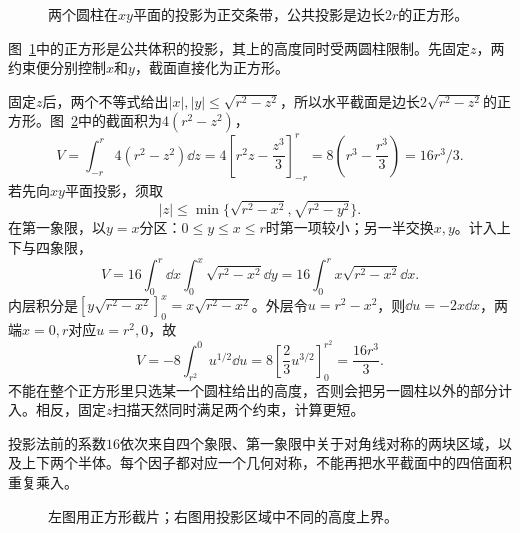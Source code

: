 \begin{figure}[H]\centering
{}
\caption{两个圆柱在$xy$平面的投影为正交条带，公共投影是边长$2r$的正方形。}\label{fig:c4-e7-q}
\end{figure}
\begin{solution}
图~\ref{fig:c4-e7-q}中的正方形是公共体积的投影，其上的高度同时受两圆柱限制。先固定$z$，两约束便分别控制$x$和$y$，截面直接化为正方形。


固定$z$后，两个不等式给出$|x|,|y|\le\sqrt{r^2-z^2}$，所以水平截面是边长$2\sqrt{r^2-z^2}$的正方形。图~\ref{fig:c4-e7-s}中的截面积为$4(r^2-z^2)$，
\[V=\int_{-r}^r4(r^2-z^2)\dd z
=4\left[r^2z-\frac{z^3}{3}\right]_{-r}^r
=8\left(r^3-\frac{r^3}{3}\right)=\boxed{16r^3/3}.\]
若先向$xy$平面投影，须取
\[|z|\le\min\{\sqrt{r^2-x^2},\sqrt{r^2-y^2}\}.
\]
在第一象限，以$y=x$分区：$0\le y\le x\le r$时第一项较小；另一半交换$x,y$。计入上下与四象限，
\[V=16\int_0^r\dd x\int_0^x\sqrt{r^2-x^2}\dd y
=16\int_0^rx\sqrt{r^2-x^2}\dd x.
\]
内层积分是$[y\sqrt{r^2-x^2}]_0^x=x\sqrt{r^2-x^2}$。外层令$u=r^2-x^2$，则$\dd u=-2x\dd x$，两端$x=0,r$对应$u=r^2,0$，故
\[V=-8\int_{r^2}^0u^{1/2}\dd u
=8\left[\frac23u^{3/2}\right]_0^{r^2}=\frac{16r^3}{3}.\]
不能在整个正方形里只选某一个圆柱给出的高度，否则会把另一圆柱以外的部分计入。相反，固定$z$扫描天然同时满足两个约束，计算更短。


投影法前的系数$16$依次来自四个象限、第一象限中关于对角线对称的两块区域，以及上下两个半体。每个因子都对应一个几何对称，不能再把水平截面中的四倍面积重复乘入。

\begin{figure}[H]\centering
{}
\caption{左图用正方形截片；右图用投影区域中不同的高度上界。}\label{fig:c4-e7-s}
\end{figure}
\end{solution}

